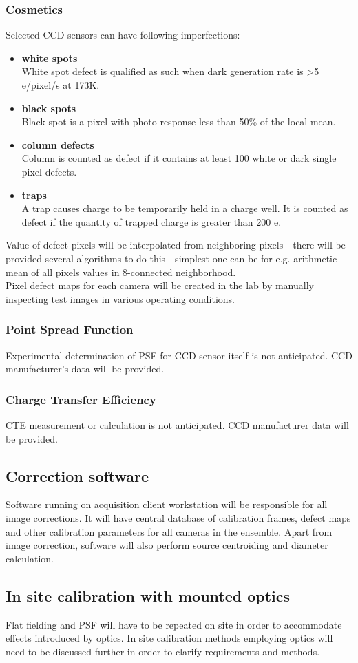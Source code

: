 \subsubsection{Cosmetics}
Selected CCD sensors can have following imperfections:
\begin{itemize}
\item \textbf{white spots} \hfill \\
White spot defect is qualified as such when dark generation rate is >5 e/pixel/s at 173K.
\item \textbf{black spots} \hfill \\
Black spot is a pixel with photo-response less than 50\% of the local mean.
\item \textbf{column defects} \hfill \\
Column is counted as defect if it contains at least 100 white or dark single pixel defects.
\item \textbf{traps} \hfill \\
A trap causes charge to be temporarily held in a charge well. It is counted as defect if the quantity of trapped charge is greater than 200 e.
\end{itemize}

Value of defect pixels will be interpolated from neighboring pixels - there will be provided several algorithms to do this - simplest one can be for e.g. arithmetic mean of all pixels values in 8-connected neighborhood. \\
Pixel defect maps for each camera will be created in the lab by manually inspecting test images in various operating conditions.

\subsubsection{Point Spread Function}
Experimental determination of PSF for CCD sensor itself is not anticipated. CCD manufacturer's data will be provided.

\subsubsection{Charge Transfer Efficiency}
CTE measurement or calculation is not anticipated. CCD manufacturer data will be provided.

\subsection{Correction software}
Software running on acquisition client workstation will be responsible for all image corrections. It will have central database of calibration frames, defect maps and other calibration parameters for all cameras in the ensemble. Apart from image correction, software will also perform source centroiding and diameter calculation.

\subsection{In site calibration with mounted optics}
Flat fielding and PSF will have to be repeated on site in order to accommodate effects introduced by optics. In site calibration methods employing optics will need to be discussed further in order to clarify requirements and methods.
